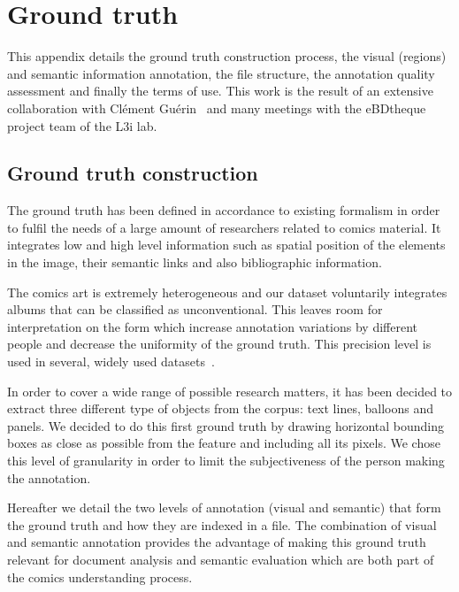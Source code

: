 \chapter{Ground truth}
\label{app:groundtruth}
\graphicspath{{./chapters/Appendix/figs/}}

This appendix details the ground truth construction process, the visual (regions) and semantic information annotation, the file structure, the annotation quality assessment and finally the terms of use.
This work is the result of an extensive collaboration with Cl{\'e}ment Gu{\'e}rin~\cite{phdthesisGuerin14} and many meetings with the eBDtheque project team of the L3i lab.


\section{Ground truth construction} %
\label{sec:ground_truth_construction}

The ground truth has been defined in accordance to existing formalism in order to fulfil the needs of a large amount of researchers related to comics material.
It integrates low and high level information such as spatial position of the elements in the image, their semantic links and also bibliographic information.


The comics art is extremely heterogeneous and our dataset voluntarily integrates albums that can be classified as
unconventional.
This leaves room for interpretation on the form which increase annotation variations by different people and decrease the uniformity of the ground truth.
This precision level is used in several, widely used datasets~\cite{pascal-voc-2012, yao2007introduction}.

In order to cover a wide range of possible research matters, it has been decided to extract three different type of objects from the corpus: text lines, balloons and panels.
We decided to do this first ground truth by drawing horizontal bounding boxes as close as possible from the feature and including all its pixels.
We chose this level of granularity in order to limit the subjectiveness of the person making the annotation.

Hereafter we detail the two levels of annotation (visual and semantic) that form the ground truth and how they are indexed in a file.
The combination of visual and semantic annotation provides the advantage of making this ground truth relevant for document analysis and semantic evaluation which are both part of the comics understanding process.

